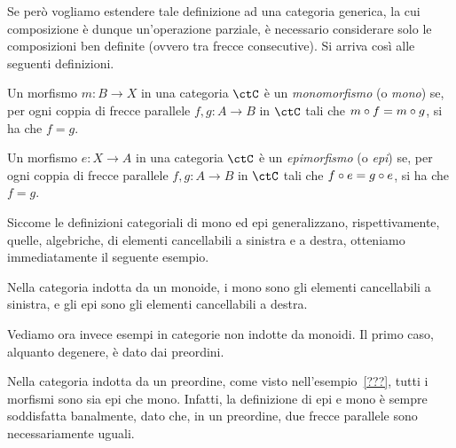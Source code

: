 Se però vogliamo estendere tale definizione ad una categoria generica,
la cui composizione è dunque un'operazione parziale,
è necessario considerare solo le composizioni ben definite
(ovvero tra frecce consecutive).
Si arriva così alle seguenti definizioni.

\begin{definition}[Monomorfismo]\label{def_Mono}
	Un morfismo \(m \colon B \to X\) in una categoria \(\ctC\) è un \emph{monomorfismo} (o \emph{mono}) se,
	per ogni coppia di frecce parallele \(f, g \colon A \to B\) in \(\ctC\) tali che \(m \circ f = m \circ g\), si ha che \(f = g\).
\end{definition}

\begin{definition}[Epimorfismo]\label{def_Epi}
	Un morfismo \(e \colon X \to A\) in una categoria \(\ctC\) è un \emph{epimorfismo} (o \emph{epi}) se,
	per ogni coppia di frecce parallele \(f, g \colon A \to B\) in \(\ctC\) tali che \(f \circ e = g \circ e\), si ha che \(f = g\).
\end{definition}

Siccome le definizioni categoriali di mono ed epi generalizzano, rispettivamente, quelle, algebriche, di elementi cancellabili a sinistra e a destra,
otteniamo immediatamente il seguente esempio.

\begin{example}
	Nella categoria indotta da un monoide, i mono sono gli elementi cancellabili a sinistra,
	e gli epi sono gli elementi cancellabili a destra.
\end{example}

Vediamo ora invece esempi in categorie non indotte da monoidi.
Il primo caso, alquanto degenere, è dato dai preordini.

\begin{example}
	Nella categoria indotta da un preordine, come visto nell'esempio~\ref{???},
	tutti i morfismi sono sia epi che mono.
	Infatti, la definizione di epi e mono è sempre soddisfatta banalmente,
	dato che, in un preordine, due frecce parallele sono necessariamente uguali.
\end{example}

